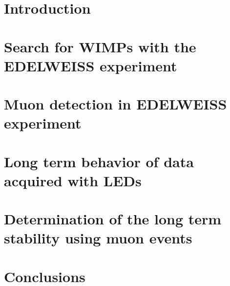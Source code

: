 \documentclass{include/thesisclass}
\begin{document}
    \FrontMatter

    
    

    \begingroup \let\clearpage\relax    %
    \tableofcontents                    %
    \endgroup
    \cleardoublepage



    \MainMatter

    \chapter{Introduction}
    \label{chap:intro}
    
    \chapter{Search for WIMPs with the EDELWEISS experiment}
    \label{chap:theo}
    
    \chapter{Muon detection in EDELWEISS experiment}
    \label{chap:muon}
    
    \chapter{Long term behavior of data acquired with LEDs}
    \label{chap:ana_led}
    
    \chapter{Determination of the long term stability using muon events }
    \label{chap:ana_muon}
    
    \chapter{Conclusions}
    \label{conclusion}






    \Appendix
    \chapter*{\appendixname} 
\end{document}

